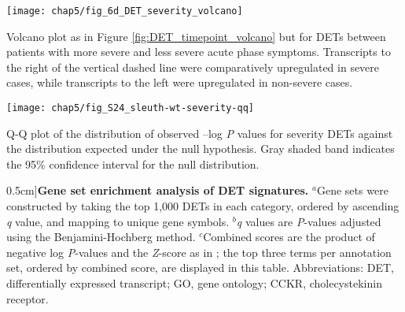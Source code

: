 \begin{marginfigure}[-5cm]
  \centering
  \texttt{[image: chap5/fig\_6d\_DET\_severity\_volcano]}
  \caption[Volcano plot of differentially expressed host transcripts for symptom severity]{
  Volcano plot as in Figure \ref{fig:DET_timepoint_volcano} but for DETs between patients with more severe and less severe acute phase symptoms. Transcripts to the right of the vertical dashed line were comparatively upregulated in severe cases, while transcripts to the left were upregulated in non-severe cases. 
  }
  \label{fig:DET_severity_volcano}
\end{marginfigure}
\begin{marginfigure}
  \centering
  \texttt{[image: chap5/fig\_S24\_sleuth-wt-severity-qq]}
  \caption[...]{
    Q-Q plot of the distribution of observed –log \emph{P} values for severity DETs against the distribution expected under the null hypothesis. Gray shaded band indicates the 95\% confidence interval for the null distribution.
  }
  \label{fig:DET_severity_qq}
\end{marginfigure}
\begin{table*}[htb]
  
  \caption[Gene set enrichment analysis of DET signatures][0.5cm]{\textbf{Gene set enrichment analysis of DET signatures.}
  $^a$Gene sets were constructed by taking the top 1,000 DETs in each category, ordered by ascending \emph{q} value, and mapping to unique gene symbols. $^b$\emph{q} values are \emph{P}-values adjusted using the Benjamini-Hochberg method. $^c$Combined scores are the product of negative log \emph{P}-values and the \emph{Z}-score as in \textcite{Chen2013}; the top three terms per annotation set, ordered by combined score, are displayed in this table. Abbreviations: DET, differentially expressed transcript; GO, gene ontology; CCKR, cholecystekinin receptor.
}
  \label{tab:chik_det_enrichr}
\end{table*}

